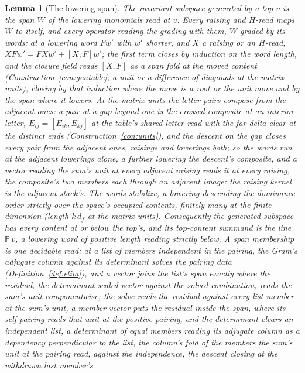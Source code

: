 \documentclass[11pt]{article}
\newtheorem{lemma}{Lemma}
\theoremstyle{definition}
\begin{document}
\begin{lemma}[The lowering span]\label{lem:lowerspan}
The invariant subspace generated by a top $v$ is the span $W$ of the
lowering monomials read at $v$. Every raising and $H$-read maps $W$ to
itself, and every operator reading the grading with them, $W$
graded by its words: at a lowering word $Fw'$ with $w'$ shorter,
and $X$ a raising or
an $H$-read, $XFw'=FXw'+[X,F]w'$; the first term closes by induction on the
word length, and the closure field reads $[X,F]$ as a span fold at
the moved content (Construction~\ref{con:gentable}; a unit or a
difference of diagonals at the matrix units), closing by that
induction where the move is a root or the unit move and by the
span where it lowers. At the matrix units the letter pairs compose
from the adjacent ones: a pair at a gap beyond one is the crossed
composite at an interior letter, $E_{ij}=[E_{ik},E_{kj}]$ at the
table's shared-letter read with the far delta clear at the
distinct ends (Construction~\ref{con:units}), and the descent on
the gap closes every pair from the adjacent ones, raisings and
lowerings both; so the words run at the adjacent lowerings alone,
a further lowering the descent's composite, and a vector reading
the sum's unit at every adjacent raising reads it at every
raising, the composite's two members each through an adjacent
image: the raising kernel is the adjacent stack's. The words stabilize, a lowering descending
the dominance order strictly over the space's occupied contents,
finitely many at the finite dimension (length $k\,d_f$ at the
matrix units). Consequently
the generated subspace has every content at or below the top's, and its
top-content summand is the line $\mathbb P\,v$, a lowering
word of positive length reading strictly below. A span membership
is one decidable read: at a list of members independent in the
pairing, the Gram's adjugate column against its determinant solves
the pairing data (Definition~\ref{def:elim}), and a vector joins
the list's span exactly where the \emph{residual}, the
determinant-scaled vector against the solved combination, reads
the sum's unit componentwise; the solve reads the residual against
every list member at the sum's unit, a member vector puts the
residual inside the span, where its self-pairing reads that unit
at the positive pairing, and the determinant clears an independent
list, a determinant of equal members reading its adjugate column
as a dependency perpendicular to the list, the column's fold of
the members the sum's unit at the pairing read, against the
independence, the descent closing at the withdrawn last member's

\end{lemma}
\end{document}
